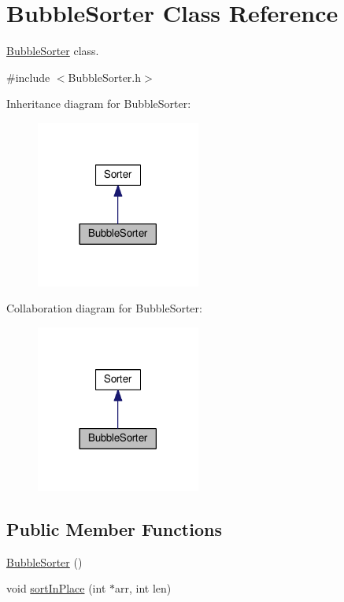 \hypertarget{class_bubble_sorter}{}\section{Bubble\+Sorter Class Reference}
\label{class_bubble_sorter}


\hyperlink{class_bubble_sorter}{Bubble\+Sorter} class.  




{\ttfamily \#include $<$Bubble\+Sorter.\+h$>$}



Inheritance diagram for Bubble\+Sorter\+:
\nopagebreak
\begin{figure}[H]
\begin{center}
\leavevmode
\includegraphics[width=153pt]{class_bubble_sorter__inherit__graph}
\end{center}
\end{figure}


Collaboration diagram for Bubble\+Sorter\+:
\nopagebreak
\begin{figure}[H]
\begin{center}
\leavevmode
\includegraphics[width=153pt]{class_bubble_sorter__coll__graph}
\end{center}
\end{figure}
\subsection*{Public Member Functions}
\begin{DoxyCompactItemize}
\item 
\hyperlink{class_bubble_sorter_a1f4d62f7f9c513a7d3e08966b0a0670c}{Bubble\+Sorter} ()
\item 
void \hyperlink{class_bubble_sorter_ab430d94d65daffbe7ccc9e747e05b653}{sort\+In\+Place} (int $\ast$arr, int len)
\end{DoxyCompactItemize}
